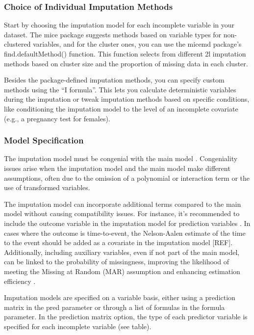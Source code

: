 \documentclass[
  article]{jss}
\begin{document}
\hypertarget{choice-of-individual-imputation-methods}{%
\subsubsection{Choice of Individual Imputation
Methods}\label{choice-of-individual-imputation-methods}}

Start by choosing the imputation model for each incomplete variable in
your dataset. The mice package suggests methods based on variable types
for non-clustered variables, and for the cluster ones, you can use the
micemd package's find.defaultMethod() function. This function selects
from different 2l imputation methods based on cluster size and the
proportion of missing data in each cluster.

Besides the package-defined imputation methods, you can specify custom
methods using the ``I formula''. This lets you calculate deterministic
variables during the imputation or tweak imputation methods based on
specific conditions, like conditioning the imputation model to the level
of an incomplete covariate (e.g., a pregnancy test for females).

\hypertarget{model-specification}{%
\subsubsection{Model Specification}\label{model-specification}}

The imputation model must be congenial with the main model
\cite{meng1994}. Congeniality issues arise when the imputation model and
the main model make different assumptions, often due to the omission of
a polynomial or interaction term or the use of transformed variables.

The imputation model can incorporate additional terms compared to the
main model without causing compatibility issues. For instance, it's
recommended to include the outcome variable in the imputation model for
prediction variables \cite{moons2006}. In cases where the outcome is
time-to-event, the Nelson-Aalen estimate of the time to the event should
be added as a covariate in the imputation model {[}REF{]}. Additionally,
including auxiliary variables, even if not part of the main model, can
be linked to the probability of missingness, improving the likelihood of
meeting the Missing at Random (MAR) assumption and enhancing estimation
efficiency \cite{hardt2012}.

Imputation models are specified on a variable basis, either using a
prediction matrix in the pred parameter or through a list of formulas in
the formula parameter. In the prediction matrix option, the type of each
predictor variable is specified for each incomplete variable (see
table).
\end{document}
